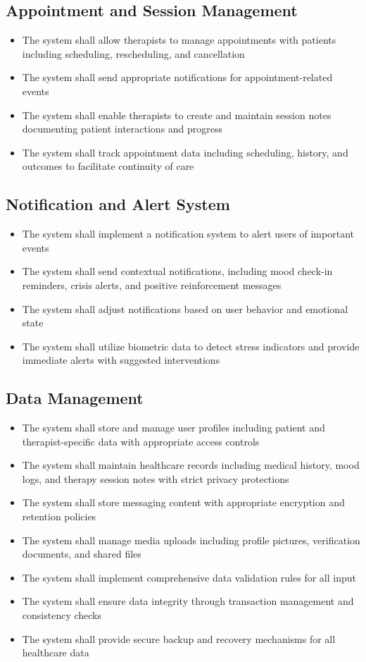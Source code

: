\subsection{Appointment and Session Management}
\begin{itemize}
    \item The system shall allow therapists to manage appointments with patients including scheduling, rescheduling, and cancellation
    \item The system shall send appropriate notifications for appointment-related events
    \item The system shall enable therapists to create and maintain session notes documenting patient interactions and progress
    \item The system shall track appointment data including scheduling, history, and outcomes to facilitate continuity of care
\end{itemize}

\subsection{Notification and Alert System}
\begin{itemize}
    \item The system shall implement a notification system to alert users of important events
    \item The system shall send contextual notifications, including mood check-in reminders, crisis alerts, and positive reinforcement messages
    \item The system shall adjust notifications based on user behavior and emotional state
    \item The system shall utilize biometric data to detect stress indicators and provide immediate alerts with suggested interventions
\end{itemize}

\subsection{Data Management}
\begin{itemize}
    \item The system shall store and manage user profiles including patient and therapist-specific data with appropriate access controls
    \item The system shall maintain healthcare records including medical history, mood logs, and therapy session notes with strict privacy protections
    \item The system shall store messaging content with appropriate encryption and retention policies
    \item The system shall manage media uploads including profile pictures, verification documents, and shared files
    \item The system shall implement comprehensive data validation rules for all input
    \item The system shall ensure data integrity through transaction management and consistency checks
    \item The system shall provide secure backup and recovery mechanisms for all healthcare data
\end{itemize}

